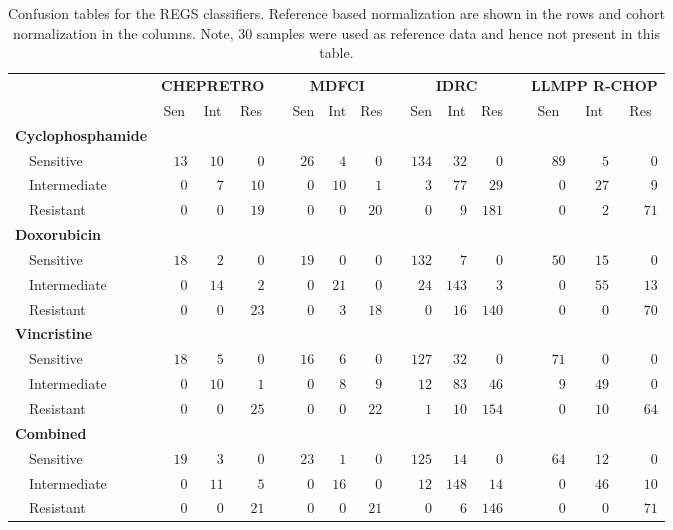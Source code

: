 \begin{table}[!tbp]
\begin{adjustwidth}{-1in}{0in}
{\small
\caption{Confusion tables for the REGS classifiers.
Reference based normalization are shown in the rows and cohort normalization in
the columns. Note, 30 samples were used as reference data and hence not present
in this table.\label{tab:confusiondrugreference}} 
\begin{center}
\begin{tabular}{lrrrcrrrcrrrcrrr}
\hline\hline
\multicolumn{1}{l}{\bfseries }&\multicolumn{3}{c}{\bfseries CHEPRETRO}&\multicolumn{1}{c}{\bfseries }&\multicolumn{3}{c}{\bfseries MDFCI}&\multicolumn{1}{c}{\bfseries }&\multicolumn{3}{c}{\bfseries IDRC}&\multicolumn{1}{c}{\bfseries }&\multicolumn{3}{c}{\bfseries LLMPP R-CHOP}\tabularnewline
\cline{2-4} \cline{6-8} \cline{10-12} \cline{14-16}
\multicolumn{1}{l}{}&\multicolumn{1}{c}{Sen}&\multicolumn{1}{c}{Int}&\multicolumn{1}{c}{Res}&\multicolumn{1}{c}{}&\multicolumn{1}{c}{Sen}&\multicolumn{1}{c}{Int}&\multicolumn{1}{c}{Res}&\multicolumn{1}{c}{}&\multicolumn{1}{c}{Sen}&\multicolumn{1}{c}{Int}&\multicolumn{1}{c}{Res}&\multicolumn{1}{c}{}&\multicolumn{1}{c}{Sen}&\multicolumn{1}{c}{Int}&\multicolumn{1}{c}{Res}\tabularnewline
\hline
{\bfseries Cyclophosphamide}&&&&&&&&&&&&&&&\tabularnewline
~~Sensitive&$13$&$10$&$ 0$&&$26$&$ 4$&$ 0$&&$134$&$ 32$&$  0$&&$89$&$ 5$&$ 0$\tabularnewline
~~Intermediate&$ 0$&$ 7$&$10$&&$ 0$&$10$&$ 1$&&$  3$&$ 77$&$ 29$&&$ 0$&$27$&$ 9$\tabularnewline
~~Resistant&$ 0$&$ 0$&$19$&&$ 0$&$ 0$&$20$&&$  0$&$  9$&$181$&&$ 0$&$ 2$&$71$\tabularnewline
\hline
{\bfseries Doxorubicin}&&&&&&&&&&&&&&&\tabularnewline
~~Sensitive&$18$&$ 2$&$ 0$&&$19$&$ 0$&$ 0$&&$132$&$  7$&$  0$&&$50$&$15$&$ 0$\tabularnewline
~~Intermediate&$ 0$&$14$&$ 2$&&$ 0$&$21$&$ 0$&&$ 24$&$143$&$  3$&&$ 0$&$55$&$13$\tabularnewline
~~Resistant&$ 0$&$ 0$&$23$&&$ 0$&$ 3$&$18$&&$  0$&$ 16$&$140$&&$ 0$&$ 0$&$70$\tabularnewline
\hline
{\bfseries Vincristine}&&&&&&&&&&&&&&&\tabularnewline
~~Sensitive&$18$&$ 5$&$ 0$&&$16$&$ 6$&$ 0$&&$127$&$ 32$&$  0$&&$71$&$ 0$&$ 0$\tabularnewline
~~Intermediate&$ 0$&$10$&$ 1$&&$ 0$&$ 8$&$ 9$&&$ 12$&$ 83$&$ 46$&&$ 9$&$49$&$ 0$\tabularnewline
~~Resistant&$ 0$&$ 0$&$25$&&$ 0$&$ 0$&$22$&&$  1$&$ 10$&$154$&&$ 0$&$10$&$64$\tabularnewline
\hline
{\bfseries Combined}&&&&&&&&&&&&&&&\tabularnewline
~~Sensitive&$19$&$ 3$&$ 0$&&$23$&$ 1$&$ 0$&&$125$&$ 14$&$  0$&&$64$&$12$&$ 0$\tabularnewline
~~Intermediate&$ 0$&$11$&$ 5$&&$ 0$&$16$&$ 0$&&$ 12$&$148$&$ 14$&&$ 0$&$46$&$10$\tabularnewline
~~Resistant&$ 0$&$ 0$&$21$&&$ 0$&$ 0$&$21$&&$  0$&$  6$&$146$&&$ 0$&$ 0$&$71$\tabularnewline
\hline
\end{tabular}\end{center}}
\end{adjustwidth}
\end{table}
